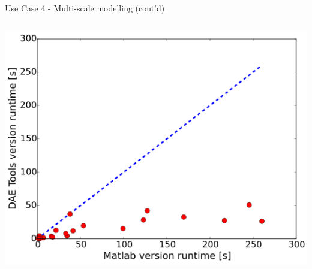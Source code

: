 \documentclass[compress,newPxFont,sthlmFooter]{beamer}
\begin{document}
\begin{frame}{Use Case 4 - Multi-scale modelling (cont'd)}
\begin{columns}[c]
      \begin{column}{0.40\paperwidth}
        \begin{center}
          \includegraphics[align=c, width=\textwidth]{parity_plot.png}
        \end{center}
      \end{column}
    \end{columns}
\end{frame}
\end{document}
